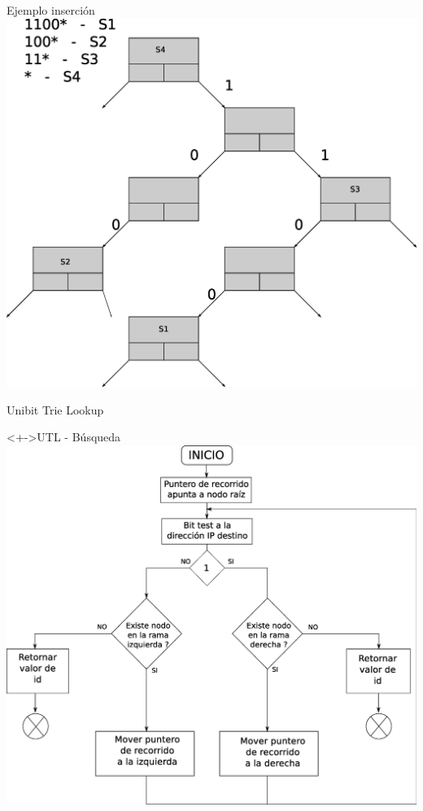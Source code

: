 \documentclass[xcolor=dvipsnames]{beamer}
\begin{document}
\begin{frame}{Ejemplo inserción} 
\center	
\includegraphics[scale=0.30]{figures/lluinsert09.eps} 
\end{frame}


\begin{frame}{Unibit Trie Lookup}
  \begin{block}<+->{UTL - Búsqueda} 
	\center	
	\includegraphics[scale=0.20]{figures/utlsearch.eps}  
  \end{block}

\end{frame}
\end{document}
